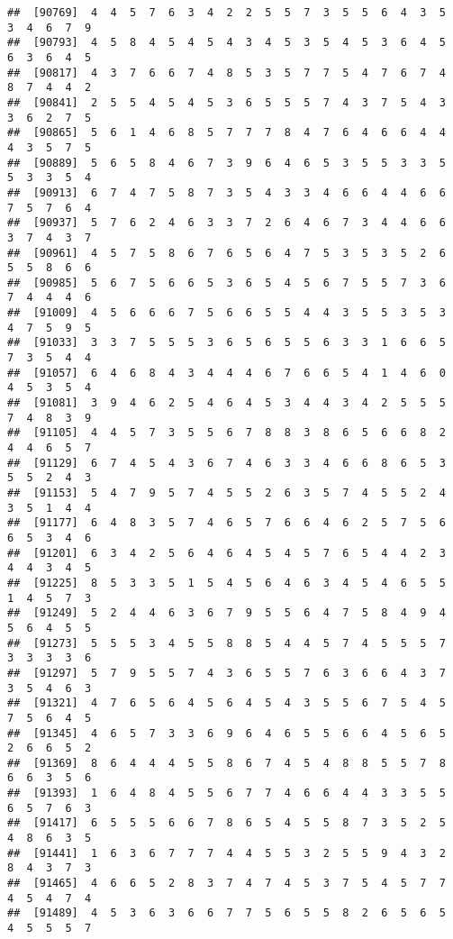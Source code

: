 \documentclass[
]{book}
\begin{document}
\begin{verbatim}
##  [90769]  4  4  5  7  6  3  4  2  2  5  5  7  3  5  5  6  4  3  5  3  4  6  7  9
##  [90793]  4  5  8  4  5  4  5  4  3  4  5  3  5  4  5  3  6  4  5  6  3  6  4  5
##  [90817]  4  3  7  6  6  7  4  8  5  3  5  7  7  5  4  7  6  7  4  8  7  4  4  2
##  [90841]  2  5  5  4  5  4  5  3  6  5  5  5  7  4  3  7  5  4  3  3  6  2  7  5
##  [90865]  5  6  1  4  6  8  5  7  7  7  8  4  7  6  4  6  6  4  4  4  3  5  7  5
##  [90889]  5  6  5  8  4  6  7  3  9  6  4  6  5  3  5  5  3  3  5  5  3  3  5  4
##  [90913]  6  7  4  7  5  8  7  3  5  4  3  3  4  6  6  4  4  6  6  7  5  7  6  4
##  [90937]  5  7  6  2  4  6  3  3  7  2  6  4  6  7  3  4  4  6  6  3  7  4  3  7
##  [90961]  4  5  7  5  8  6  7  6  5  6  4  7  5  3  5  3  5  2  6  5  5  8  6  6
##  [90985]  5  6  7  5  6  6  5  3  6  5  4  5  6  7  5  5  7  3  6  7  4  4  4  6
##  [91009]  4  5  6  6  6  7  5  6  6  5  5  4  4  3  5  5  3  5  3  4  7  5  9  5
##  [91033]  3  3  7  5  5  5  3  6  5  6  5  5  6  3  3  1  6  6  5  7  3  5  4  4
##  [91057]  6  4  6  8  4  3  4  4  4  6  7  6  6  5  4  1  4  6  0  4  5  3  5  4
##  [91081]  3  9  4  6  2  5  4  6  4  5  3  4  4  3  4  2  5  5  5  7  4  8  3  9
##  [91105]  4  4  5  7  3  5  5  6  7  8  8  3  8  6  5  6  6  8  2  4  4  6  5  7
##  [91129]  6  7  4  5  4  3  6  7  4  6  3  3  4  6  6  8  6  5  3  5  5  2  4  3
##  [91153]  5  4  7  9  5  7  4  5  5  2  6  3  5  7  4  5  5  2  4  3  5  1  4  4
##  [91177]  6  4  8  3  5  7  4  6  5  7  6  6  4  6  2  5  7  5  6  6  5  3  4  6
##  [91201]  6  3  4  2  5  6  4  6  4  5  4  5  7  6  5  4  4  2  3  4  4  3  4  5
##  [91225]  8  5  3  3  5  1  5  4  5  6  4  6  3  4  5  4  6  5  5  1  4  5  7  3
##  [91249]  5  2  4  4  6  3  6  7  9  5  5  6  4  7  5  8  4  9  4  5  6  4  5  5
##  [91273]  5  5  5  3  4  5  5  8  8  5  4  4  5  7  4  5  5  5  7  3  3  3  3  6
##  [91297]  5  7  9  5  5  7  4  3  6  5  5  7  6  3  6  6  4  3  7  3  5  4  6  3
##  [91321]  4  7  6  5  6  4  5  6  4  5  4  3  5  5  6  7  5  4  5  7  5  6  4  5
##  [91345]  4  6  5  7  3  3  6  9  6  4  6  5  5  6  6  4  5  6  5  2  6  6  5  2
##  [91369]  8  6  4  4  4  5  5  8  6  7  4  5  4  8  8  5  5  7  8  6  6  3  5  6
##  [91393]  1  6  4  8  4  5  5  6  7  7  4  6  6  4  4  3  3  5  5  6  5  7  6  3
##  [91417]  6  5  5  5  6  6  7  8  6  5  4  5  5  8  7  3  5  2  5  4  8  6  3  5
##  [91441]  1  6  3  6  7  7  7  4  4  5  5  3  2  5  5  9  4  3  2  8  4  3  7  3
##  [91465]  4  6  6  5  2  8  3  7  4  7  4  5  3  7  5  4  5  7  7  4  5  4  7  4
##  [91489]  4  5  3  6  3  6  6  7  7  5  6  5  5  8  2  6  5  6  5  4  5  5  5  7

\end{verbatim}
\end{document}
